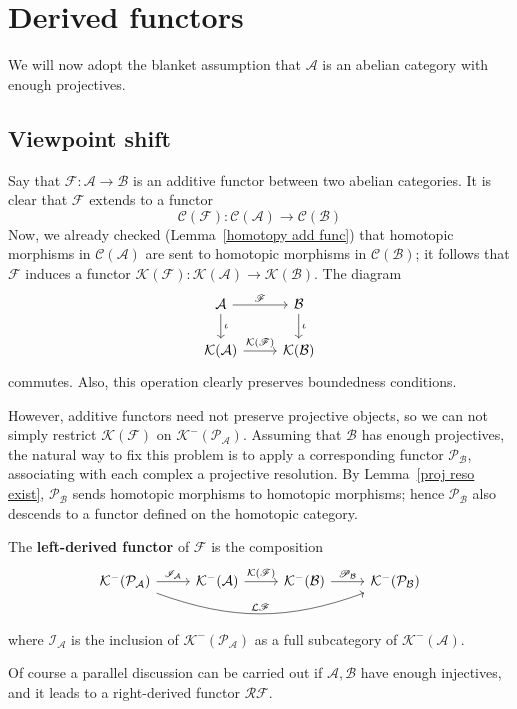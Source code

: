\section{Derived functors}
We will now adopt the blanket assumption that $\mathcal{A}$ is an abelian category with enough projectives.
\subsection{Viewpoint shift}
Say that $\mathscr{F}:\mathcal{A}\to\mathcal{B}$ is an additive functor between two abelian categories. It is clear that $\mathscr{F}$ extends to a functor
\[\mathcal{C}(\mathscr{F}):\mathcal{C}(\mathcal{A})\to\mathcal{C}(\mathcal{B})\]
Now, we already checked (Lemma~\ref{homotopy add func}) that homotopic morphisms in $\mathcal{C}(\mathcal{A})$ are sent to homotopic morphisms in $\mathcal{C}(\mathcal{B})$; it follows
that $\mathscr{F}$ induces a functor $\mathcal{K}(\mathscr{F}):\mathcal{K}(\mathcal{A})\to\mathcal{K}(\mathcal{B})$. The diagram
\[\begin{tikzcd}
\mathcal{A}\ar[d,"\iota"]\ar[r,"\mathscr{F}"]&\mathcal{B}\ar[d,"\iota"]\\
\mathcal{K}(\mathcal{A})\ar[r,"\mathcal{K}(\mathscr{F})"]&\mathcal{K}(\mathcal{B})
\end{tikzcd}\]
commutes. Also, this operation clearly preserves boundedness conditions.\par
However, additive functors need not preserve projective objects, so we can not simply restrict $\mathcal{K}(\mathscr{F})$ on $\mathcal{K}^-(\mathcal{P}_{\mathcal{A}})$. Assuming that $\mathcal{B}$ has enough projectives, the natural way to fix this problem is to apply a corresponding functor $\mathscr{P}_{\mathcal{B}}$, associating with each complex a projective resolution. By Lemma~\ref{proj reso exist}, $\mathscr{P}_{\mathcal{B}}$ sends homotopic morphisms to homotopic morphisms; hence $\mathscr{P}_{\mathcal{B}}$ also descends to a functor defined on the homotopic category.
\begin{definition}
The \textbf{left-derived functor} of $\mathscr{F}$ is the composition
\[\begin{tikzcd}
\mathcal{K}^-(\mathcal{P}_{\mathcal{A}})\ar[rrr,bend right=20,"\mathcal{L}\mathscr{F}"]\ar[r,"\mathscr{I}_{\mathcal{A}}"]&\mathcal{K}^-(\mathcal{A})\ar[r,"\mathcal{K}(\mathscr{F})"]&\mathcal{K}^-(\mathcal{B})\ar[r,"\mathscr{P}_{\mathcal{B}}"]&\mathcal{K}^-(\mathcal{P}_{\mathcal{B}})
\end{tikzcd}\]
where $\mathscr{I}_{\mathcal{A}}$ is the inclusion of $\mathcal{K}^-(\mathcal{P}_{\mathcal{A}})$ as a full subcategory of $\mathcal{K}^-(\mathcal{A})$.
\end{definition}
Of course a parallel discussion can be carried out if $\mathcal{A},\mathcal{B}$ have enough injectives, and it leads to a right-derived functor $\mathcal{R}\mathscr{F}$.
